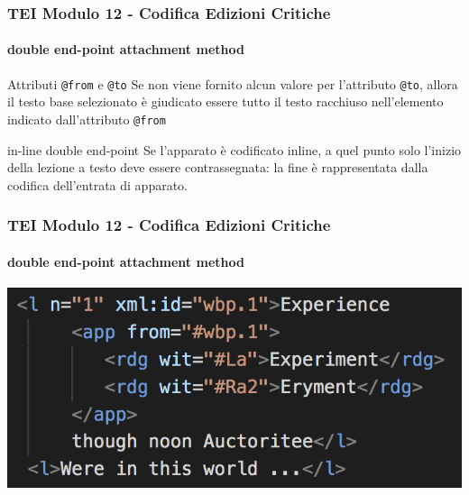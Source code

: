 \begin{frame}
    \frametitle{TEI Modulo 12 - Codifica Edizioni Critiche}
    \framesubtitle{double end-point attachment method}
    \addtocounter{nframe}{1}
    


   

    \begin{block}{Attributi \texttt{@from} e \texttt{@to}}
      Se non viene fornito alcun valore per l'attributo \texttt{@to}, allora il testo base selezionato è giudicato essere tutto il testo racchiuso nell'elemento indicato dall'attributo \texttt{@from}
    \end{block}
    
    \begin{block}{in-line double end-point}
       Se l'apparato è codificato inline, a quel punto solo l'inizio della lezione a testo deve essere contrassegnata: la fine è rappresentata dalla codifica dell'entrata di apparato.
    \end{block}

\end{frame}

\begin{frame}
    \frametitle{TEI Modulo 12 - Codifica Edizioni Critiche}
    \framesubtitle{double end-point attachment method}
    \addtocounter{nframe}{1}
    
   
    \begin{center}
       \includegraphics[width=.95\textwidth]{imgs/inline-double-end-point.png}
    \end{center}

\end{frame}

